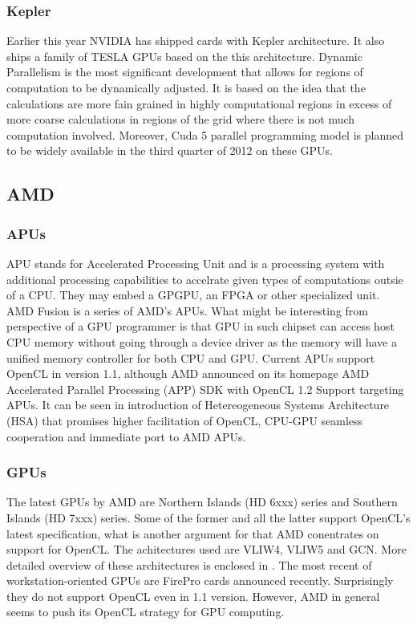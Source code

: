 \subsubsection{Kepler}
Earlier this year NVIDIA has shipped cards with Kepler architecture.\cite{nvidia2012keplerwhite} It also ships a family of TESLA GPUs based on the this architecture. Dynamic Parallelism is the most significant development that allows for regions of computation to be dynamically adjusted. It is based on the idea that the calculations are more fain grained in highly computational regions in excess of more coarse calculations in regions of the grid where there is not much computation involved. Moreover, Cuda 5 parallel programming model is planned to be widely available in the third quarter of 2012 on these GPUs.\cite{kepler2012news1, kepler2012news2}

\subsection{AMD}

\subsubsection{APUs}
APU stands for Accelerated Processing Unit and is a processing system with additional processing capabilities to accelrate given types of computations outsie of a CPU. They may embed a GPGPU, an FPGA or other specialized unit. AMD Fusion is a series of AMD's APUs. What might be interesting from perspective of a GPU programmer is that GPU in such chipset can access host CPU memory without going through a device driver as the memory will have a unified memory controller for both CPU and GPU. Current APUs support OpenCL in version 1.1, although AMD announced on its homepage AMD Accelerated Parallel Processing (APP) SDK with OpenCL 1.2 Support targeting APUs. It can be seen in introduction of Hetereogeneous Systems Architecture (HSA) that promises higher facilitation of OpenCL, CPU-GPU seamless cooperation and immediate port to AMD APUs.

\subsubsection{GPUs}
The latest GPUs by AMD are Northern Islands (HD 6xxx) series and Southern Islands (HD 7xxx) series. Some of the former and all the latter support OpenCL's latest specification, what is another argument for that AMD conentrates on support for OpenCL. The achitectures used are VLIW4, VLIW5 and GCN. More detailed overview of these architectures is enclosed in \cite{nielsen2012}. The most recent of workstation-oriented GPUs are FirePro cards announced recently. Surprisingly they do not support OpenCL even in 1.1 version. However, AMD in general seems to push its OpenCL strategy for GPU computing.

